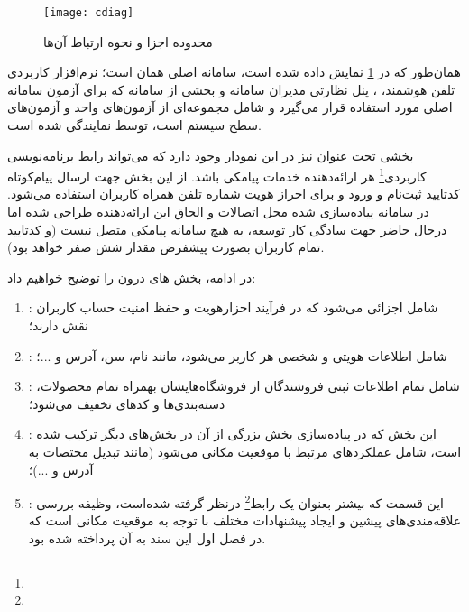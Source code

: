 \newpage



\begin{figure}[H]
	\centering
	\texttt{[image: cdiag]}
	\caption{محدوده اجزا و نحوه ارتباط آن‌ها}
	\label{fig:cdiag}
\end{figure}

همان‌طور که در \cref{fig:cdiag} نمایش داده شده است، سامانه اصلی همان  است؛ نرم‌افزار کاربردی تلفن هوشمند، ، پنل نظارتی مدیران سامانه  و بخشی از سامانه که برای آزمون سامانه اصلی مورد استفاده قرار می‌گیرد و شامل مجموعه‌ای از آزمون‌های واحد و آزمون‌های سطح سیستم است، توسط  نمایندگی شده است.

\newpage

بخشی تحت عنوان  نیز در این نمودار وجود دارد که می‌تواند رابط برنامه‌نویسی کاربردی\footnote{} هر ارائه‌دهنده خدمات پیامکی باشد. از این بخش جهت ارسال پیام‌کوتاه کدتایید ثبت‌نام و ورود و برای احراز هویت شماره تلفن همراه کاربران استفاده می‌شود. در سامانه پیاده‌سازی شده محل اتصالات و الحاق این ارائه‌دهنده طراحی شده اما درحال حاضر جهت سادگی کار توسعه، به هیچ سامانه پیامکی متصل نیست (و کدتایید تمام کاربران بصورت پیشفرض مقدار شش صفر خواهد بود).

در ادامه، بخش های درون  را توضیح خواهیم داد:

\begin{enumerate}
	\item {}: شامل اجزائی می‌شود که در فرآیند احزارهویت و حفظ امنیت حساب کاربران نقش دارند؛
	\item {}: شامل اطلاعات هویتی و شخصی هر کاربر می‌شود، مانند نام، سن، آدرس و ...؛
	\item {}: شامل تمام اطلاعات ثبتی فروشندگان از فروشگاه‌هایشان بهمراه تمام محصولات، دسته‌بندی‌ها و کدهای تخفیف می‌شود؛
	\item {}: این بخش که در پیاده‌سازی بخش بزرگی از آن در بخش‌های دیگر ترکیب شده است، شامل عملکردهای مرتبط با موقعیت مکانی می‌شود (مانند تبدیل مختصات به آدرس و ...)؛
	\item {}: این قسمت که بیشتر بعنوان یک رابط\footnote{} درنظر گرفته شده‌است، وظیفه بررسی علاقه‌مندی‌های پیشین و ایجاد پیشنهادات مختلف با توجه به موقعیت مکانی است که در فصل اول این سند به آن پرداخته شده بود.
\end{enumerate}

